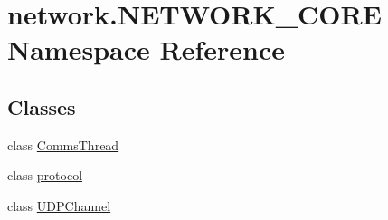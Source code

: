 \hypertarget{namespacenetwork_1_1NETWORK__CORE}{}\section{network.\+N\+E\+T\+W\+O\+R\+K\+\_\+\+C\+O\+R\+E Namespace Reference}
\label{namespacenetwork_1_1NETWORK__CORE}
\subsection*{Classes}
\begin{DoxyCompactItemize}
\item 
class \hyperlink{classnetwork_1_1NETWORK__CORE_1_1CommsThread}{Comms\+Thread}
\item 
class \hyperlink{classnetwork_1_1NETWORK__CORE_1_1protocol}{protocol}
\item 
class \hyperlink{classnetwork_1_1NETWORK__CORE_1_1UDPChannel}{U\+D\+P\+Channel}
\end{DoxyCompactItemize}
